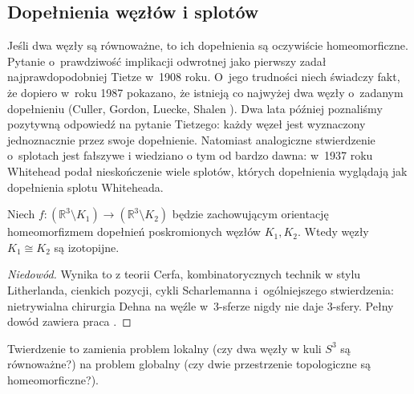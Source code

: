 
\subsection{Dopełnienia węzłów i splotów}
Jeśli dwa węzły są równoważne, to ich dopełnienia są oczywiście homeomorficzne.
Pytanie o~prawdziwość implikacji odwrotnej jako pierwszy zadał najprawdopodobniej Tietze \cite{tietze1908} w~1908 roku.
%
O~jego trudności niech świadczy fakt, że dopiero w~roku 1987 pokazano, że istnieją co najwyżej dwa węzły o~zadanym dopełnieniu (Culler, Gordon, Luecke, Shalen \cite{culler1987}).
%
%
%
%
Dwa lata później poznaliśmy pozytywną odpowiedź na pytanie Tietzego: każdy węzeł jest wyznaczony jednoznacznie przez swoje dopełnienie.
Natomiast analogiczne stwierdzenie o~splotach jest fałszywe i wiedziano o tym od bardzo dawna: w~1937 roku Whitehead \cite{whitehead1937} podał nieskończenie wiele splotów, których dopełnienia wyglądają jak dopełnienia splotu Whiteheada.

\begin{theorem}
%
%
%
    Niech $f \colon (\mathbb R^3 \setminus K_1) \to (\mathbb R^3 \setminus K_2)$ będzie zachowującym orientację homeomorfizmem dopełnień poskromionych węzłów $K_1, K_2$.
    Wtedy węzły $K_1 \cong K_2$ są izotopijne.
\end{theorem}

\begin{proof}[Niedowód]
    Wynika to z teorii Cerfa, kombinatorycznych technik w stylu Litherlanda, cienkich pozycji, cykli Scharlemanna i~ogólniejszego stwierdzenia: nietrywialna chirurgia Dehna na węźle w~3-sferze nigdy nie daje 3-sfery.
%
%
%
    Pełny dowód zawiera praca \cite{gordon1989}.
\end{proof}

Twierdzenie to zamienia problem lokalny (czy dwa węzły w kuli $S^3$ są równoważne?) na problem globalny (czy dwie przestrzenie topologiczne są homeomorficzne?).
%

